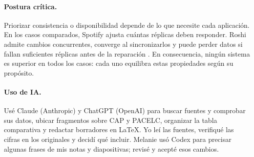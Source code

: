 \paragraph{Postura crítica.}
Priorizar consistencia o disponibilidad depende de lo que necesite cada
aplicación. En los casos comparados, Spotify
ajusta cuántas réplicas deben responder. Roshi admite cambios concurrentes,
converge al sincronizarlos y puede perder datos si fallan suficientes
réplicas antes de la reparación \cite{soundcloudRoshi}. En consecuencia, ningún sistema
es superior en todos los casos: cada uno equilibra estas propiedades según
su propósito.

\paragraph{Uso de IA.}
Usé Claude (Anthropic) y ChatGPT (OpenAI) para buscar fuentes y comprobar
sus datos, ubicar fragmentos sobre CAP y PACELC, organizar la tabla
comparativa y redactar borradores en LaTeX. Yo leí las fuentes, verifiqué
las cifras en los originales y decidí qué incluir. Melanie usó Codex para
precisar algunas frases de mis notas y diapositivas; revisé y acepté esos
cambios.
